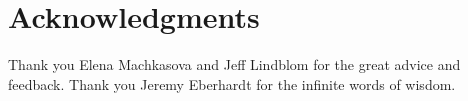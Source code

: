 \documentclass{sig-alternate}
\begin{document}
\section*{Acknowledgments}
\label{sec:acknowledgments}


Thank you Elena Machkasova and Jeff Lindblom for the great advice and feedback.
Thank you Jeremy Eberhardt for the infinite words of wisdom.




\end{document}
